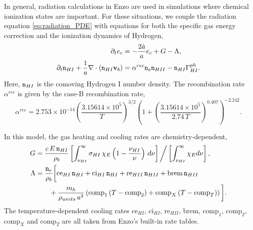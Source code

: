 \documentclass[letterpaper,10pt]{article}
\renewcommand{\(}{\left(}
\renewcommand{\)}{\right)}
\newcommand{\vb}{{\bf v}_b}
\newcommand{\rhob}{\rho_b}
\newcommand{\mn}{{\tt n}}
\begin{document}
In general, radiation calculations in Enzo are used in simulations
where chemical ionization states are important.  For these situations, 
we couple the radiation equation \eqref{eq:radiation_PDE} with
equations for both the specific gas energy correction and the
ionization dynamics of Hydrogen,
\begin{align}
  \notag
  \partial_t e_c &= -\frac{2\dot{a}}{a}e_c + G - \Lambda, \\
  \label{eq:hydrogen_ionization}
  \partial_t \mn_{HI} + \frac{1}{a}\nabla\cdot\(\mn_{HI}\vb\) &=
    \alpha^{rec} \mn_e \mn_{HII} - \mn_{HI} \Gamma_{HI}^{ph}. 
\end{align}
Here, $\mn_{HI}$ is the comoving Hydrogen I number density.  The
recombination rate $\alpha^{rec}$ is given by the case-B
recombination rate, 
\begin{equation}
\label{eq:alphaB}
\alpha^{rec} = 2.753\times 10^{-14} \left(\frac{3.15614\times 10^5}{T}\right)^{3/2} 
                   \left(1+\left(\frac{3.15614\times 10^5}{2.74\, T}\right)^{0.407}\right)^{-2.242}.
\end{equation}

In this model, the gas heating and cooling rates are
chemistry-dependent, 
\begin{align}
  \label{eq:G_nLTE}
  G &= \frac{c\,E\,\mn_{HI}}{\rhob} 
    \left[\int_{\nu_{HI}}^{\infty} \sigma_{HI}\, \chi_E
    \left(1-\frac{\nu_{HI}}{\nu}\right)\, d\nu\right] \bigg/
    \left[\int_{\nu_{HI}}^{\infty} \chi_E d\nu\right], \\
\label{eq:Lambda_nLTE}
  \Lambda &= \frac{\mn_e}{\rhob}\bigg[\text{ce}_{HI}\, \mn_{HI} 
  + \text{ci}_{HI}\, \mn_{HI} + \text{re}_{HII}\, \mn_{HII} + \text{brem}\,
  \mn_{HII} \\
  \notag &\qquad+ \frac{m_h}{\rho_{units}\, a^3} \left(\text{comp}_1\, (T-\text{comp}_2) 
    + \text{comp}_{X}\, (T-\text{comp}_{T})\right) \bigg].
\end{align}
The temperature-dependent cooling rates
$\text{ce}_{HI}$, $\text{ci}_{HI}$, $\text{re}_{HII}$, $\text{brem}$,
$\text{comp}_1$, $\text{comp}_2$, $\text{comp}_{X}$ and
$\text{comp}_{T}$ are all taken from Enzo's built-in rate tables.
\end{document}
